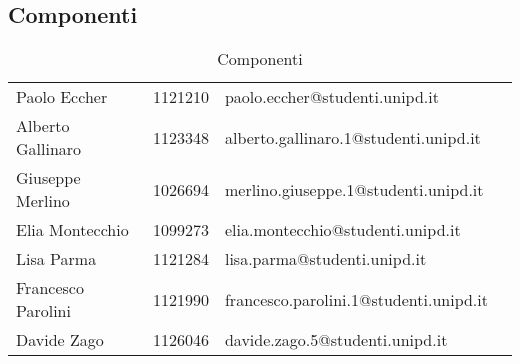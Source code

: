 	\subsection{Componenti}	
	\begin{table}[H]
		\centering
		\begin{tabular}{|p{2cm}|C{3cm}|C{5.5cm}|C{3cm}|}
			\hline
			 &  & & \\
			\hline			
			Paolo Eccher & 1121210 & paolo.eccher@studenti.unipd.it  &   \\
			\hline
			Alberto Gallinaro & 1123348 & alberto.gallinaro.1@studenti.unipd.it  &  \\
			\hline
			Giuseppe Merlino & 1026694 & merlino.giuseppe.1@studenti.unipd.it &  \\
			\hline
			Elia Montecchio & 1099273 & elia.montecchio@studenti.unipd.it & \\
			\hline
			Lisa Parma & 1121284 & lisa.parma@studenti.unipd.it & \\
			\hline
			Francesco Parolini & 1121990 & francesco.parolini.1@studenti.unipd.it  & \\
			\hline
			Davide Zago & 1126046 & davide.zago.5@studenti.unipd.it & \\
			\hline
		\end{tabular}
		\caption{Componenti}
	\end{table}
	
	
